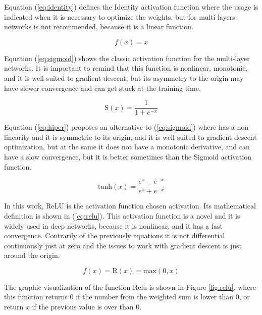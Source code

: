         


Equation (\ref{eq:identity}) defines the Identity activation function where the usage is indicated when it is necessary to optimize the weights, but for multi layers networks is not recommended, because it is a linear function. 


\begin{equation}\label{eq:identity}
    f(x) = x
\end{equation}


Equation (\ref{eq:sigmoid}) shows the classic activation function for the multi-layer networks. It is important to remind that this function is nonlinear, monotonic, and it is well suited to gradient descent, but its asymmetry to the origin may have slower convergence and can get stuck at the training time.     


\begin{equation}\label{eq:sigmoid}
    \mathrm{S}(x) = \frac{1}{1+e^{-x}}
\end{equation}

        
Equation (\ref{eq:hiper}) proposes an alternative to (\ref{eq:sigmoid}) where has a non-linearity and it is symmetric to its origin, and it is well suited to gradient descent optimization, but at the same it does not have a monotonic derivative, and can have a slow convergence, but it is better sometimes than the Sigmoid activation function.


\begin{equation}\label{eq:hiper}
 \mathrm{tanh}(x) = \frac{e^{x}-e^{-x}}{e^{x}+e^{-x}}
\end{equation}


    


In this work, ReLU is the activation function chosen activation. Its mathematical definition is shown in (\ref{eq:relu}). This activation function is a novel and it is widely used in deep networks, because it is nonlinear, and it has a fast convergence. Contrarily of the previously equations it is not differential continuously just at zero and the issues to work with gradient descent is just around the origin. 


\begin{equation}
\label{eq:relu}
    f(x) = \mathrm{R}(x) = \mathrm{max}(0,x)
\end{equation}


The graphic visualization of the function Relu is shown in Figure \ref{fig:relu}, where this function returns $0$ if the number from the weighted sum is lower than $0$, or return $x$ if the previous value is over than $0$.


